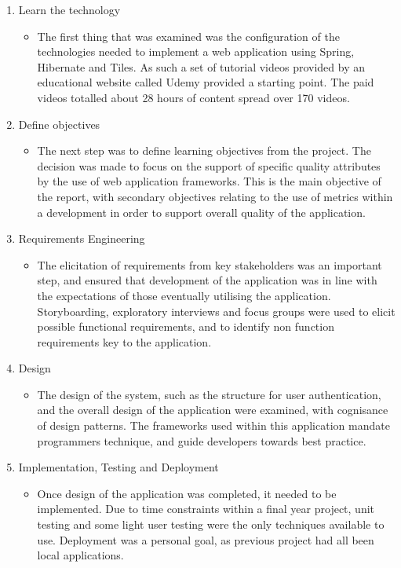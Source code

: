\begin{enumerate}
\item Learn the technology
\begin{itemize}
\item The first thing that was examined was the configuration of the technologies needed to implement a web application using Spring, Hibernate and Tiles. As such a set of tutorial videos provided by an educational website called Udemy provided a starting point. The paid videos totalled about 28 hours of content spread over 170 videos.\parencite{udemy}
\end{itemize}
\item Define objectives
\begin{itemize}
\item The next step was to define learning objectives from the project. The decision was made to focus on the support of specific quality attributes by the use of web application frameworks. This is the main objective of the report, with secondary objectives relating to the use of metrics within a development in order to support overall quality of the application.
\end{itemize}
\item Requirements Engineering
\begin{itemize}
\item The elicitation of requirements from key stakeholders was an important step, and ensured that development of the application was in line with the expectations of those eventually utilising the application. Storyboarding, exploratory interviews and focus groups were used to elicit possible functional requirements, and to identify non function requirements key to the application.
\end{itemize}
\item Design
\begin{itemize}
\item The design of the system, such as the structure for user authentication, and the overall design of the application were examined, with cognisance of design patterns. The frameworks used within this application mandate programmers technique, and guide developers towards best practice.
\end{itemize}
\item Implementation, Testing and Deployment
\begin{itemize}
\item Once design of the application was completed, it needed to be implemented. Due to time constraints within a final year project, unit testing and some light user testing were the only techniques available to use. Deployment was a personal goal, as previous project had all been local applications.

\end{itemize}
\end{enumerate}
